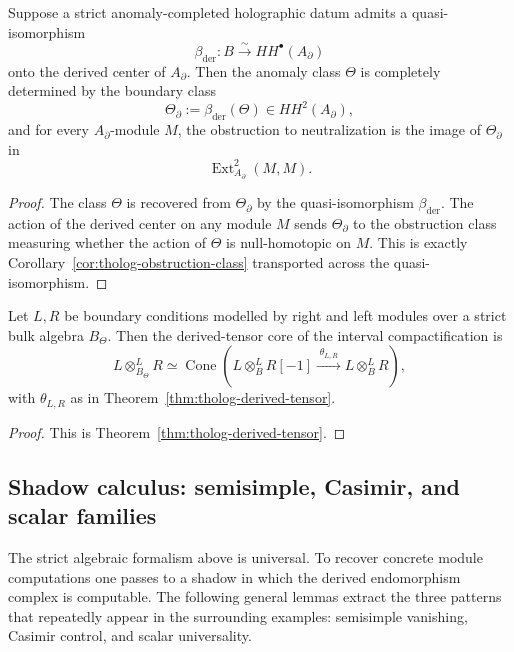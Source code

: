 \begin{proposition}
Suppose a strict anomaly-completed holographic datum admits a quasi-isomorphism
\[
\beta_{\mathrm{der}}:B\stackrel{\sim}{\longrightarrow} HH^{\bullet}(A_{\partial})
\]
onto the derived center of \(A_{\partial}\).
Then the anomaly class \(\Theta\) is completely determined by the boundary class
\[
\Theta_{\partial}:=\beta_{\mathrm{der}}(\Theta)\in HH^{2}(A_{\partial}),
\]
and for every \(A_{\partial}\)-module \(M\), the obstruction to neutralization is the image of \(\Theta_{\partial}\) in
\[
\operatorname{Ext}^{2}_{A_{\partial}}(M,M).
\]
\end{proposition}

\begin{proof}
The class \(\Theta\) is recovered from \(\Theta_{\partial}\) by the quasi-isomorphism \(\beta_{\mathrm{der}}\).
The action of the derived center on any module \(M\) sends \(\Theta_{\partial}\) to the obstruction class measuring whether the action of \(\Theta\) is null-homotopic on \(M\).
This is exactly Corollary~\ref{cor:tholog-obstruction-class} transported across the quasi-isomorphism.
\end{proof}

\begin{corollary}
Let \(L,R\) be boundary conditions modelled by right and left modules over a strict bulk algebra \(B_{\Theta}\).
Then the derived-tensor core of the interval compactification is
\[
L\otimes^{L}_{B_{\Theta}}R
\simeq
\operatorname{Cone}\!\left(
L\otimes^{L}_{B}R[-1]
\xrightarrow{\;\theta_{L,R}\;}
L\otimes^{L}_{B}R
\right),
\]
with \(\theta_{L,R}\) as in Theorem~\ref{thm:tholog-derived-tensor}.
\end{corollary}

\begin{proof}
This is Theorem~\ref{thm:tholog-derived-tensor}.
\end{proof}

\subsection{Shadow calculus: semisimple, Casimir, and scalar families}

The strict algebraic formalism above is universal.
To recover concrete module computations one passes to a shadow in which the derived endomorphism complex is computable.
The following general lemmas extract the three patterns that repeatedly appear in the surrounding examples: semisimple vanishing, Casimir control, and scalar universality.

